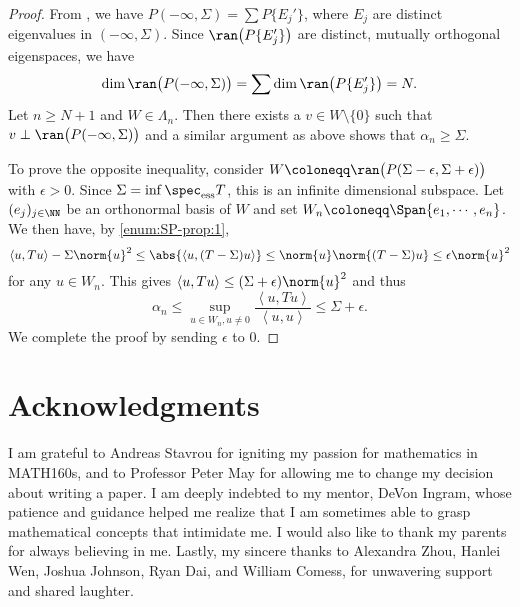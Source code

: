 \documentclass[oneside,reqno,letterpaper]{amsart}
\newcommand{\essspec}{\spec_{\text{ess}}}
\begin{document}
\begin{proof}
  From , we have \(P(-\infty, \Sigma) = \sum P \{E_j'\}\), where \(E_j\) are distinct eigenvalues in \((-\infty, \Sigma)\). 
  Since \(\ran\big(P \{E_j'\} \big)\) are distinct, mutually orthogonal eigenspaces, we have 
  \[
    \dim \ran\big(P(-\infty, \Sigma)\big)
    = \sum \dim \ran\big(P\{E_j'\}\big)
    = N .
  \] 
  Let \(n \geq N + 1\) and \(W \in \Lambda_{n}\). 
  Then there exists a \(v \in W \setminus \{0\}\) such that \(v \perp \ran\big(P(-\infty, \Sigma)\big)\) and a similar argument as above shows that \(\alpha_n \geq \Sigma\). 

  To prove the opposite inequality, consider \(W \coloneqq \ran\big(P(\Sigma - \epsilon, \Sigma + \epsilon)\big)\) with \(\epsilon > 0\). 
  Since \(\Sigma = \inf \essspec T\), this is an infinite dimensional subspace. 
  Let \((e_j)_{j \in \NN}\) be an orthonormal basis of \(W\) and set \(W_n \coloneqq \Span \{e_1, \cdots, e_n\}\).
  We then have, by  \ref{enum:SP-prop:1}, 
  \[
    \left< u, Tu \right> - \Sigma \norm{u}^2  
    \leq \abs{\left< u, (T - \Sigma)u \right>} 
    \leq \norm{u} \norm{(T - \Sigma)u} 
    \leq \epsilon \norm{u}^2 
  \] 
  for any \(u \in W_n\). 
  This gives \(\left< u, Tu \right> \leq (\Sigma + \epsilon) \norm{u}^2 \) and thus
  \[
    \alpha_n \leq \sup_{u \in W_n, u \neq 0} \frac{\left< u, Tu \right>}{\left< u, u \right>} \leq \Sigma + \epsilon . 
  \] 
  We complete the proof by sending \(\epsilon\) to \(0\). 
\end{proof}







\section*{Acknowledgments}
I am grateful to Andreas Stavrou for igniting my passion for mathematics in MATH160s, and to Professor Peter May for allowing me to change my decision about writing a paper.
I am deeply indebted to my mentor, DeVon Ingram, whose patience and guidance helped me realize that I am sometimes able to grasp mathematical concepts that intimidate me. 
I would also like to thank my parents for always believing in me.
Lastly, my sincere thanks to Alexandra Zhou, Hanlei Wen, Joshua Johnson, Ryan Dai, and William Comess, for unwavering support and shared laughter. 






\printbibliography
\nocite{*}
\end{document}
